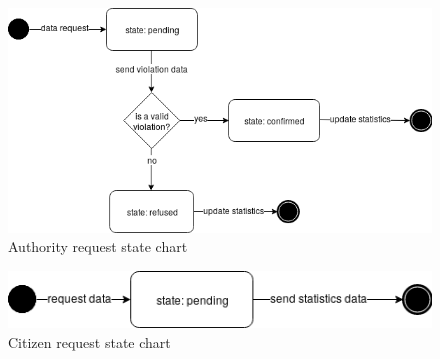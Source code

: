 \documentclass{article}
\begin{document}
\begin{figure}[h!]
    \centering
    \includegraphics[scale=0.5]{img/state_charts/authority_request.png}
    \caption{Authority request state chart}
\end{figure}

\begin{figure}[h!]
    \centering
    \includegraphics[scale=0.5]{img/state_charts/citizen_request.png}
    \caption{Citizen request state chart}
\end{figure}
\end{document}
